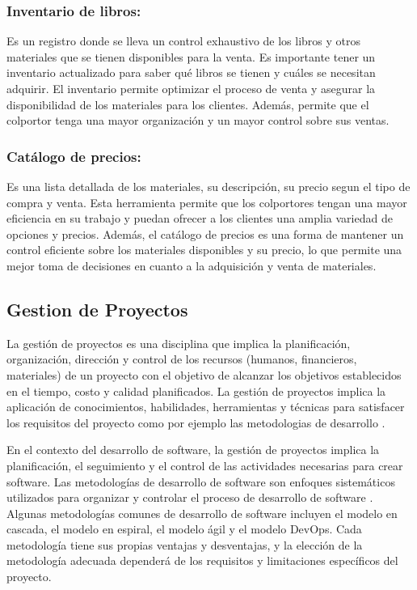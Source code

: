 \documentclass[runningheads]{llncs}
\begin{document}
\subsubsection{Inventario de libros: }Es un registro donde se lleva un control exhaustivo de los libros y otros materiales que se tienen disponibles para la venta. Es importante tener un inventario actualizado para saber qué libros se tienen y cuáles se necesitan adquirir. El inventario permite optimizar el proceso de venta y asegurar la disponibilidad de los materiales para los clientes. Además, permite que el colportor tenga una mayor organización y un mayor control sobre sus ventas.

\subsubsection{Catálogo de precios: }Es una lista detallada de los materiales, su descripción, su precio segun el tipo de compra y venta. Esta herramienta permite que los colportores tengan una mayor eficiencia en su trabajo y puedan ofrecer a los clientes una amplia variedad de opciones y precios. Además, el catálogo de precios es una forma de mantener un control eficiente sobre los materiales disponibles y su precio, lo que permite una mejor toma de decisiones en cuanto a la adquisición y venta de materiales.



\subsection{Gestion de Proyectos}
La gestión de proyectos es una disciplina que implica la planificación, organización, dirección y control de los recursos (humanos, financieros, materiales) de un proyecto con el objetivo de alcanzar los objetivos establecidos en el tiempo, costo y calidad planificados. La gestión de proyectos implica la aplicación de conocimientos, habilidades, herramientas y técnicas para satisfacer los requisitos del proyecto como por ejemplo las metodologias de desarrollo \cite{Cita1}.

En el contexto del desarrollo de software, la gestión de proyectos implica la planificación, el seguimiento y el control de las actividades necesarias para crear software. Las metodologías de desarrollo de software son enfoques sistemáticos utilizados para organizar y controlar el proceso de desarrollo de software \cite{Cita2}. Algunas metodologías comunes de desarrollo de software incluyen el modelo en cascada, el modelo en espiral, el modelo ágil y el modelo DevOps. Cada metodología tiene sus propias ventajas y desventajas, y la elección de la metodología adecuada dependerá de los requisitos y limitaciones específicos del proyecto.
\end{document}
